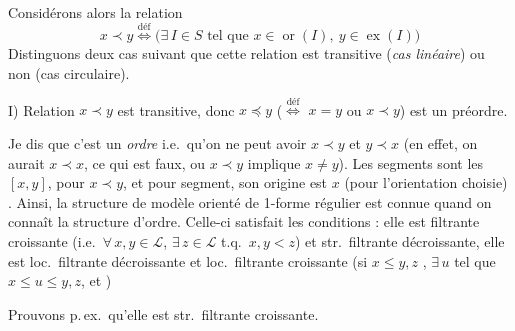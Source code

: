 \documentclass[11pt,a4paper]{article}
\begin{document}
Considérons alors la relation \struck{\ill{}}
\[
  x \prec y \overset{\text{déf}}{\Longleftrightarrow} \bigl(\exists\, I \in S \text{ tel que } x \in \operatorname{or}(I),\ y \in \operatorname{ex}(I)\bigr)
\]
Distinguons deux cas suivant que cette relation est transitive (\emph{cas linéaire}) ou non (cas circulaire).

I) Relation $x \prec y$ est transitive, donc  $x \preccurlyeq y$ ($\overset{\text{déf}}{\Longleftrightarrow}$ $x = y$ ou $x \prec y$) est un préordre.

Je dis que c'est un \emph{ordre} i.e.\ qu'on ne peut avoir $x \prec y$ et $y \prec x$ (en effet, on aurait $x \prec x$, ce qui est faux, ou $x \prec y$ implique $x \neq y$). Les segments sont les $[x,y]$, pour $x \prec y$, et pour \struck{\ill{}}  segment, son origine est $x$ (pour l'orientation choisie) . Ainsi, la structure de modèle  orienté de 1-forme régulier est connue quand on connaît la structure d'ordre. Celle-ci  satisfait les conditions : elle est  filtrante croissante (i.e.\ $\forall\, x, y \in \mathcal{L}$, $\exists\, z \in \mathcal{L}$ t.q.\ $x, y < z$) et str.\ filtrante décroissante, elle est  loc.\ filtrante décroissante et loc.\ filtrante \struck{\ill{}} croissante (si $x \leq y, z$ \struck{\ill{}}, $\exists\, u$ tel que $x \leq u \leq y, z$, et  )

Prouvons p.\,ex.\ qu'elle est str.\ filtrante croissante.
\end{document}
